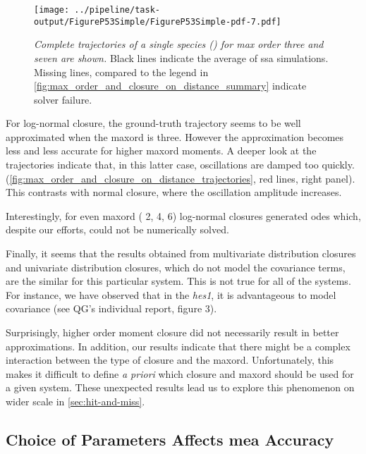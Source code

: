 \begin{figure}
    \centering
    \texttt{[image: ../pipeline/task-output/FigureP53Simple/FigureP53Simple-pdf-7.pdf]}
    \caption{\emph{Complete trajectories of a single species (\pft) for max order three and seven are shown.} 
    Black lines indicate the average of \gls{ssa} simulations. 
    Missing lines, compared to the legend in \autoref{fig:max_order_and_closure_on_distance_summary} indicate solver failure.}
    \label{fig:max_order_and_closure_on_distance_trajectories}
\end{figure}

 
For log-normal closure, the ground-truth trajectory seems to be well approximated when the \gls{maxord} is three.
However the approximation becomes less and less accurate for higher \gls{maxord} moments.
A deeper look at the trajectories indicate that, in this latter case,
oscillations are damped too quickly. (\autoref{fig:max_order_and_closure_on_distance_trajectories}, red lines, right panel).
This contrasts with normal closure, where the oscillation amplitude increases.

Interestingly, for even \gls{maxord} (\ie{} 2, 4, 6) log-normal closures generated \gls{ode}s which, despite our efforts, could not be numerically solved.

Finally, it seems that the results obtained from multivariate distribution closures and univariate distribution closures,
 which do not model the covariance terms, are the similar for this particular system.
This is not true for all of the systems.
For instance, we have observed that in the \emph{hes1}, it is advantageous to model covariance (see QG's individual report, figure 3).


Surprisingly, higher order moment closure did not necessarily result in better approximations.
In addition, our results indicate that there might be a complex interaction between the type of closure and the \gls{maxord}.
Unfortunately, this makes it difficult to define \emph{a priori} which closure and \gls{maxord} should be used for a given system.
These unexpected results lead us to explore this phenomenon on wider scale in \autoref{sec:hit-and-miss}.




\subsection{Choice of Parameters Affects \acrshort{mea} Accuracy}
\label{sec:hit-and-miss}

